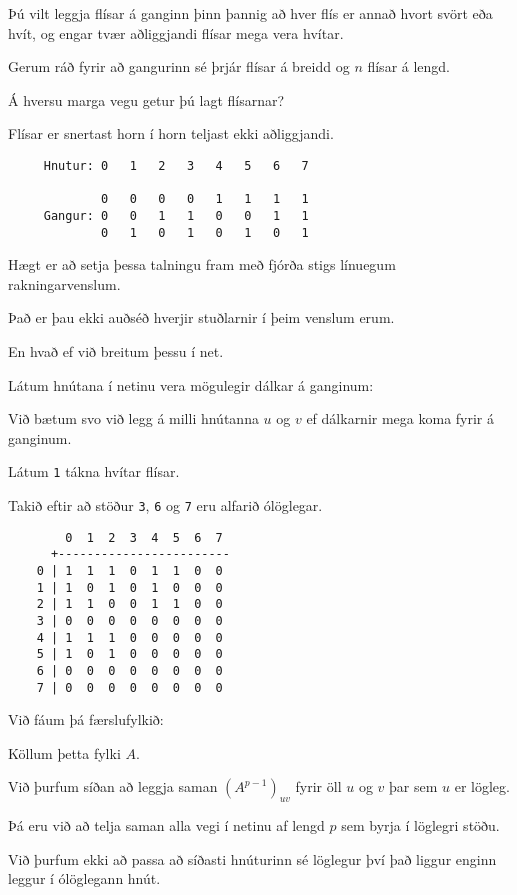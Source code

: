 {
	{
		\item<1-> Þú vilt leggja flísar á ganginn þinn þannig að hver flís er annað hvort svört eða hvít,
					og engar tvær aðliggjandi flísar mega vera hvítar.
		\item<2-> Gerum ráð fyrir að gangurinn sé þrjár flísar á breidd og $n$ flísar á lengd.
		\item<3-> Á hversu marga vegu getur þú lagt flísarnar?
		\item<4-> Flísar er snertast horn í horn teljast ekki aðliggjandi.
	}
}

{ \begin{verbatim}
     Hnutur: 0   1   2   3   4   5   6   7

             0   0   0   0   1   1   1   1
     Gangur: 0   0   1   1   0   0   1   1
             0   1   0   1   0   1   0   1
\end{verbatim}}
{
	{
		\item<1-> Hægt er að setja þessa talningu fram með fjórða stigs línuegum rakningarvenslum.
		\item<2-> Það er þau ekki auðséð hverjir stuðlarnir í þeim venslum erum.
		\item<3-> En hvað ef við breitum þessu í net.
		\item<4-> Látum hnútana í netinu vera mögulegir dálkar á ganginum:
		\item<5->[] \gangar
		\item<6-> Við bætum svo við legg á milli hnútanna $u$ og $v$ ef dálkarnir mega koma fyrir á ganginum.
		\item<7-> Látum \texttt{1} tákna hvítar flísar.
		\item<8-> Takið eftir að stöður \texttt{3}, \texttt{6} og \texttt{7} eru alfarið ólöglegar.
	}
}

{ \begin{verbatim}
        0  1  2  3  4  5  6  7
      +------------------------
    0 | 1  1  1  0  1  1  0  0
    1 | 1  0  1  0  1  0  0  0
    2 | 1  1  0  0  1  1  0  0
    3 | 0  0  0  0  0  0  0  0
    4 | 1  1  1  0  0  0  0  0
    5 | 1  0  1  0  0  0  0  0
    6 | 0  0  0  0  0  0  0  0
    7 | 0  0  0  0  0  0  0  0
\end{verbatim}}
{
	{
		\item<1-> Við fáum þá færslufylkið:
		\item<2->[] \gangarfylki
		\item<3-> Köllum þetta fylki $A$.
		\item<4-> Við þurfum síðan að leggja saman $(A^{p - 1})_{uv}$ fyrir öll $u$ og $v$ þar sem $u$ er lögleg.
		\item<5-> Þá eru við að telja saman alla vegi í netinu af lengd $p$ sem byrja í löglegri stöðu.
		\item<6-> Við þurfum ekki að passa að síðasti hnúturinn sé löglegur því það liggur enginn leggur í ólöglegann hnút.
	}
}

